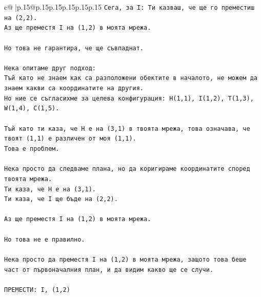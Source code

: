 \documentclass{article}
\begin{document}
{\begin{supertabular}{c@{$\;$}|p{.15\linewidth}@{}p{.15\linewidth}p{.15\linewidth}p{.15\linewidth}p{.15\linewidth}p{.15\linewidth}}
{{{\texttt{Сега, за I: Ти казваш, че ще го преместиш на (2,2).} \\
\texttt{Аз ще преместя I на (1,2) в моята мрежа.} \\
\\ 
\texttt{Но това не гарантира, че ще съвпаднат.} \\
\\ 
\texttt{Нека опитаме друг подход:} \\
\texttt{Тъй като не знаем как са разположени обектите в началото, не можем да знаем какви са координатите на другия.} \\
\texttt{Но ние се съгласихме за целева конфигурация: H(1,1), I(1,2), T(1,3), W(1,4), C(1,5).} \\
\\ 
\texttt{Тъй като ти каза, че H е на (3,1) в твоята мрежа, това означава, че твоят (1,1) е различен от моя (1,1).} \\
\texttt{Това е проблем.} \\
\\ 
\texttt{Нека просто да следваме плана, но да коригираме координатите според твоята мрежа.} \\
\texttt{Ти каза, че H е на (3,1).} \\
\texttt{Ти каза, че I ще бъде на (2,2).} \\
\\ 
\texttt{Аз ще преместя I на (1,2) в моята мрежа.} \\
\\ 
\texttt{Но това не е правилно.} \\
\\ 
\texttt{Нека просто да преместя I на (1,2) в моята мрежа, защото това беше част от първоначалния план, и да видим какво ще се случи.} \\
\\ 
\texttt{ПРЕМЕСТИ: I, (1,2)} \\
            }
        }
    }
     \\ \\


\end{supertabular}}
\end{document}
